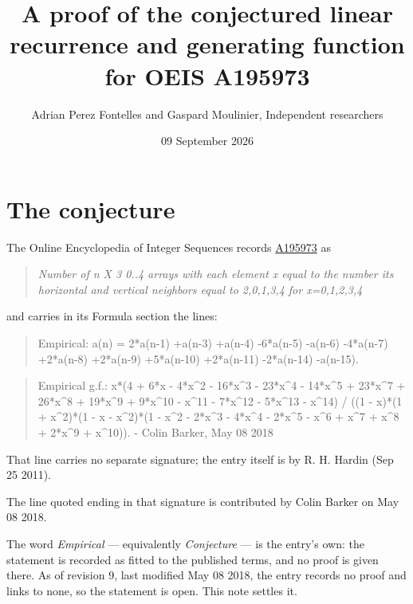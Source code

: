\documentclass[11pt]{article}
\title{A proof of the conjectured linear recurrence and generating function for OEIS A195973}
\author{Adrian Perez Fontelles and Gaspard Moulinier, Independent researchers}
\date{09 September 2026}
\theoremstyle{definition}
\begin{document}
\maketitle
\section{The conjecture}

The Online Encyclopedia of Integer Sequences records \href{https://oeis.org/A195973}{A195973} as

\begin{quote}\itshape Number of n X 3 0..4 arrays with each element x equal to the number its horizontal and vertical neighbors equal to 2,0,1,3,4 for x=0,1,2,3,4\end{quote}

and carries in its Formula section the lines:

\begin{quote}\ttfamily Empirical: a(n) = 2*a(n-1) +a(n-3) +a(n-4) -6*a(n-5) -a(n-6) -4*a(n-7) +2*a(n-8) +2*a(n-9) +5*a(n-10) +2*a(n-11) -2*a(n-14) -a(n-15).\end{quote}

\begin{quote}\ttfamily Empirical g.f.: x*(4 + 6*x - 4*x\textasciicircum{}2 - 16*x\textasciicircum{}3 - 23*x\textasciicircum{}4 - 14*x\textasciicircum{}5 + 23*x\textasciicircum{}7 + 26*x\textasciicircum{}8 + 19*x\textasciicircum{}9 + 9*x\textasciicircum{}10 - x\textasciicircum{}11 - 7*x\textasciicircum{}12 - 5*x\textasciicircum{}13 - x\textasciicircum{}14) / ((1 - x)*(1 + x\textasciicircum{}2)*(1 - x - x\textasciicircum{}2)*(1 - x\textasciicircum{}2 - 2*x\textasciicircum{}3 - 4*x\textasciicircum{}4 - 2*x\textasciicircum{}5 - x\textasciicircum{}6 + x\textasciicircum{}7 + x\textasciicircum{}8 + 2*x\textasciicircum{}9 + x\textasciicircum{}10)). - Colin Barker, May 08 2018\end{quote}

That line carries no separate signature; the entry itself is by R. H. Hardin (Sep 25 2011).

The line quoted ending in that signature is contributed by Colin Barker on May 08 2018.

The word {\itshape Empirical} --- equivalently {\itshape Conjecture} --- is the entry's own: the statement is recorded as fitted to the published terms, and no proof is given there. As of revision 9, last modified May 08 2018, the entry records no proof and links to none, so the statement is open. This note settles it.
\end{document}
